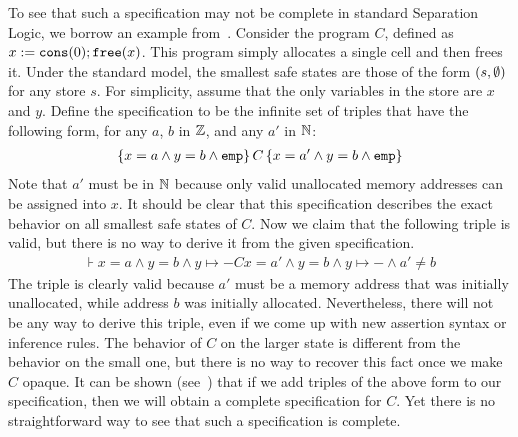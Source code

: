 To see that such a specification may not be complete
in standard Separation Logic, we borrow an example from~\cite{rg09}. Consider the program $C$, defined
as $x:=\text{\tt{cons}}(0);\text{\tt{free}}(x)$. This program simply allocates a single cell and then frees it. Under
the standard model, the smallest safe states are those of the form $(s,\emptyset)$ for any store $s$.
For simplicity, assume that the only variables in the store are $x$ and $y$. Define the specification
to be the infinite set of triples that have the following form, for any $a$, $b$ in $\mathbb{Z}$, and any
$a'$ in $\mathbb{N}$:
\begin{align*}
\{x=a \land y=b \land \text{\tt{emp}}\}\,C\,\{x=a' \land y=b \land \text{\tt{emp}}\}
\end{align*}
\noindent{}Note that $a'$ must be in $\mathbb{N}$ because only valid unallocated memory addresses can be assigned into $x$.
It should be clear that this specification describes the exact behavior on all smallest safe states of $C$.
Now we claim that the following triple is valid, but there is no way to derive it from the given specification.
\begin{align*}
\assert{x=a \land y=b \land y \mapsto -}{C}{x=a' \land y=b \land y \mapsto - \land a' \neq b}
\end{align*}
\noindent{}The triple is clearly valid because $a'$ must be a memory address that was initially unallocated, while
address $b$ was initially allocated. Nevertheless, there will not be any way to derive this triple,
even if we come up with new assertion syntax or inference rules. The behavior of $C$ on the larger
state is different from the behavior on the small one, but there is no way to recover this fact
once we make $C$ opaque. It can be shown (see~\cite{rg09}) that if we add triples of the above form to our specification,
then we will obtain a complete specification for $C$. Yet there is no straightforward way to see that such a 
specification is complete.

